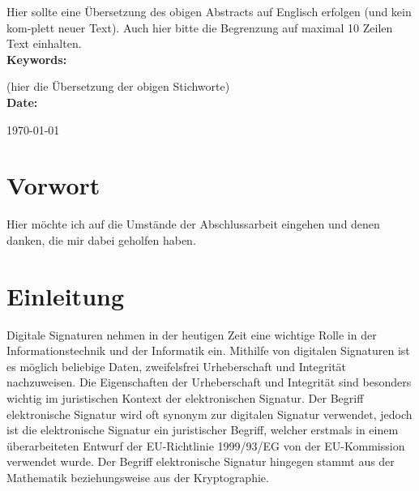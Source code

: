 \documentclass[11pt,a4paper,ngerman]{report}
\begin{document}
Hier sollte eine Übersetzung des obigen Abstracts auf Englisch erfolgen (und kein kom-plett neuer Text). Auch hier bitte die Begrenzung auf maximal 10 Zeilen Text einhalten.
\\[4ex]
\textbf{Keywords:}

(hier die Übersetzung der obigen Stichworte)
\\[4ex]
\textbf{Date:}

\today
\clearpage

\chapter*{Vorwort}
Hier möchte ich auf die Umstände der Abschlussarbeit eingehen und denen danken, die mir dabei geholfen haben.
\clearpage

\tableofcontents
\clearpage


\chapter{Einleitung}
Digitale Signaturen nehmen in der heutigen Zeit eine wichtige Rolle in der Informationstechnik und der Informatik ein. Mithilfe von digitalen Signaturen ist es möglich beliebige Daten, zweifelsfrei Urheberschaft und Integrität nachzuweisen. Die Eigenschaften der Urheberschaft und Integrität sind besonders wichtig im juristischen Kontext der elektronischen Signatur. Der Begriff elektronische Signatur wird oft synonym zur digitalen Signatur verwendet, jedoch ist die elektronische Signatur ein juristischer Begriff, welcher erstmals in einem überarbeiteten Entwurf der EU-Richtlinie 1999/93/EG von der EU-Kommission verwendet wurde.\cite{eSigEU99} Der Begriff elektronische Signatur hingegen stammt aus der Mathematik beziehungsweise aus der Kryptographie.


\clearpage
{}
{}
\listoflistings
\clearpage



\end{document}
